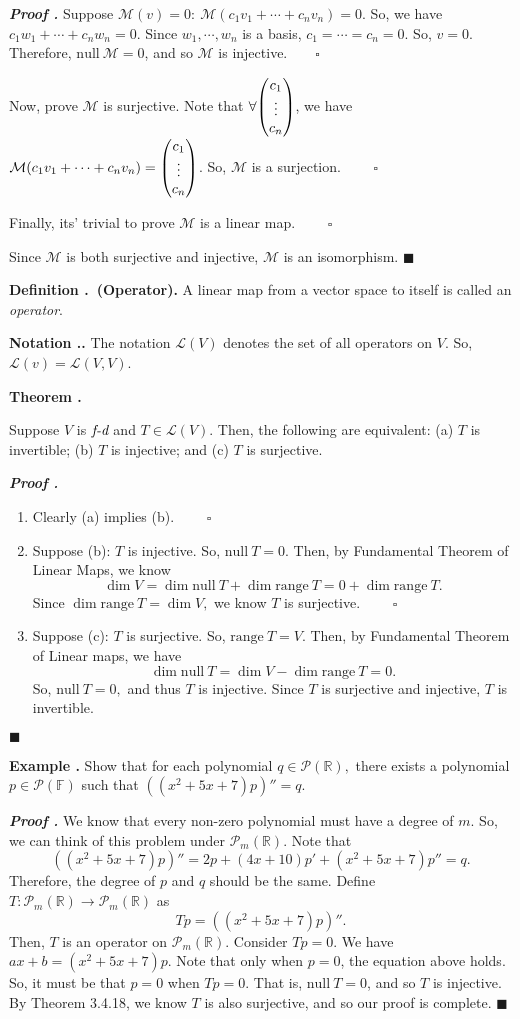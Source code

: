 \documentclass[11pt, letterpaper]{article}
\newcounter{index}[subsection]
\newenvironment*{df}[1]{\par\noindent\textbf{Definition \thesubsection.\stepcounter{index}\theindex\ (#1).}}{\par}
\newenvironment*{eg}{\begin{framed}\par\noindent\textbf{Example \thesubsection.\stepcounter{index}\theindex}}{\par\end{framed}}
\newenvironment*{thm}[1]{\begin{tcolorbox}\par\noindent\textbf{Theorem \thesubsection.\stepcounter{index}\theindex\ #1} \par}{\par\end{tcolorbox}}
\newenvironment*{nota}{\par\noindent\textbf{Notation \thesubsection.\stepcounter{index}\theindex.}}{\par}
\newcounter{nprf}[subsection]
\newenvironment*{prf}{\par\indent\textbf{\textit{Proof \stepcounter{nprf}\thenprf.}}}{\hfill$\blacksquare$\par}
\def\R{\mathbb{R}}
\def\F{\mathbb{F}}
\def\P{\mathcal{P}}
\def\L{\mathcal{L}}
\def\M{\mathcal{M}}
\def\FD{\emph{f-d}}
\def\pqde{\qquad\square}
\def\Null{\mathrm{null\ }}
\def\range{\mathrm{range\ }}
\begin{document}
\begin{prf}
	Suppose $\M(v)=0:\ \M(c_1v_1+\cdots+c_nv_n)=0$. So, we have $c_1w_1+\cdots+c_nw_n=0$. Since $w_1,\cdots,w_n$ is a basis, $c_1=\cdots=c_n=0$. So, $v=0$. Therefore, $\Null\M=\qty{0}$, and so $\M$ is injective.$\pqde$\par 
	Now, prove $\M$ is surjective. Note that $\forall\mqty(c_1\\\vdots\\c_n)$, we have $\M(c_1v_1+\cdots+c_nv_n)=\mqty(c_1\\\vdots\\c_n)$. So, $\M$ is a surjection. $\pqde$\par 
	Finally, its' trivial to prove $\M$ is a linear map. $\pqde$\par 
	Since $\M$ is both surjective and injective, $\M$ is an isomorphism. 	
\end{prf}
\begin{df}{Operator}
	A linear map from a vector space to itself is called an \textit{operator}.
\end{df}
\begin{nota}
	The notation $\L(V)$ denotes the set of all operators on $V$. So, $\L(v)=\L(V,V)$.	
\end{nota}
\begin{thm}{}
	Suppose $V$ is $\FD$ and $T\in\L(V)$. Then, the following are equivalent: (a) $T$ is invertible; (b) $T$ is injective; and (c) $T$ is surjective. 
\end{thm}
\begin{prf}
	\begin{enumerate}
		\item Clearly (a) implies (b). $\pqde$
		\item Suppose (b): $T$ is injective. So, $\Null T=\qty{0}$. Then, by Fundamental Theorem of Linear Maps, we know \[\dim V=\dim\Null T+\dim\range T=0+\dim\range T.\] Since $\dim\range T=\dim V,$ we know $T$ is surjective. $\pqde$
		\item Suppose (c): $T$ is surjective. So, $\range T=V$. Then, by Fundamental Theorem of Linear maps, we have \[\dim\Null T=\dim V-\dim\range T=0.\] So, $\Null T=\qty{0},$ and thus $T$ is injective. Since $T$ is surjective and injective, $T$ is invertible. 
	\end{enumerate}	
\end{prf}
\begin{eg}
	Show that for each polynomial $q\in\P(\R),$ there exists a polynomial $p\in\P(\F)$ such that $((x^2+5x+7)p)''=q$.
\end{eg}
\begin{prf}
	We know that every non-zero polynomial must have a degree of $m$. So, we can think of this problem under $\P_m(\R)$. Note that \[((x^2+5x+7)p)''=2p+(4x+10)p'+(x^2+5x+7)p''=q.\] Therefore, the degree of $p$ and $q$ should be the same. Define $T:\P_m(\R)\to\P_m(\R)$ as \[Tp=((x^2+5x+7)p)''.\] Then, $T$ is an operator on $\P_m(\R)$. Consider $Tp=0$. We have $ax+b=(x^2+5x+7)p$. Note that only when $p=0$, the equation above holds. So, it must be that $p=0$ when $Tp=0$. That is, $\Null T=\qty{0}$, and so $T$ is injective. By Theorem 3.4.18, we know $T$ is also surjective, and so our proof is complete.
\end{prf}
\end{document}
